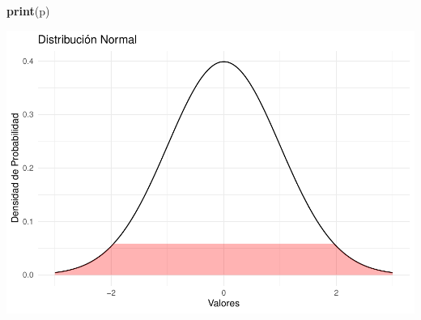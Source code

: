 \documentclass[
]{article}
\newenvironment{Shaded}{\begin{snugshade}}{\end{snugshade}}
\newcommand{\FunctionTok}[1]{\textcolor[rgb]{0.13,0.29,0.53}{\textbf{#1}}}
\newcommand{\NormalTok}[1]{#1}
\begin{document}
\begin{Shaded}
\begin{Highlighting}[]
\FunctionTok{print}\NormalTok{(p)}
\end{Highlighting}
\end{Shaded}

\includegraphics{clase02_files/figure-latex/unnamed-chunk-2-1.pdf}
\end{document}
